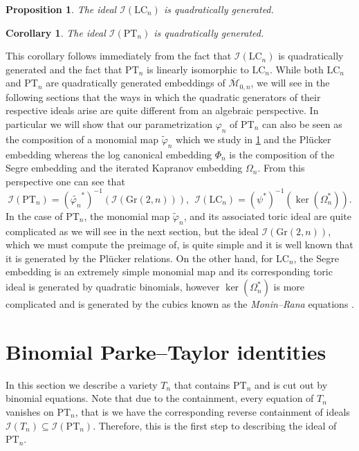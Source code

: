 \documentclass[12pt, reqno]{amsart}
\numberwithin{equation}{section}
\theoremstyle{plain}
\newtheorem{corollary}[theorem]{Corollary}
\newtheorem{proposition}[theorem]{Proposition}
\theoremstyle{definition}
\newcommand{\ci}{\mathcal{I}}
\newcommand{\monbar}{\overline{\mathcal{M}}_{0, n}}
\newcommand{\pt}{\mathrm{PT}}
\newcommand{\lc}{\mathrm{LC}}
\newcommand{\gr}{\mathrm{Gr}}
\begin{document}
\begin{proposition}\cite[Theorem 8.6]{keel2009equations}
The ideal $\ci(\lc_n)$ is quadratically generated. 
\end{proposition}


\begin{corollary}
The ideal $\ci(\pt_n)$ is quadratically generated. 
\end{corollary}



This corollary follows immediately from the fact that $\ci(\lc_n)$ is quadratically generated and the fact that $\pt_n$ is linearly isomorphic to $\lc_n$. 
While both $\lc_n$ and $\pt_n$ are quadratically generated embeddings of $\monbar$, we will see in the following sections that the ways in which the quadratic generators of their respective ideals arise are quite different from an algebraic perspective. In particular we will show that our parametrization $\varphi_n$ of $\pt_n$ can also be seen as the composition of a monomial map $\tilde{\varphi}_n$ which we study in \cref{sec:toric} and the Pl\"ucker embedding whereas the log canonical embedding $\Phi_n$ is the composition of the Segre embedding and the iterated Kapranov embedding $\Omega_n$. From this perspective one can see that
\[
\ci(\pt_n) = (\tilde{\varphi_n}^\ast)^{-1}(\ci(\gr(2,n))), ~~ \ci(\lc_n) = (\psi^\ast)^{-1}(\ker(\Omega_n^\ast)).
\]
In the case of $\pt_n$, the monomial map $\tilde{\varphi}_n$, and its associated toric ideal are quite complicated as we will see in the next section, but the ideal $\ci(\gr(2,n))$, which we must compute the preimage of, is quite simple and it is well known that it is generated by the Pl\"ucker relations. On the other hand, for $\lc_n$, the Segre embedding is an extremely simple monomial map and its corresponding toric ideal is generated by quadratic binomials, however $\ker(\Omega_n^\ast)$ is more complicated and is generated by the cubics known as the \emph{Monin--Rana} equations \cite{gillespie2022proof, monin2017equations}. 


\section{Binomial Parke--Taylor identities} \label{sec:toric}
In this section we describe a variety $T_n$ that contains $\mathrm{PT}_n$ and is cut out by binomial equations. Note that due to the containment, every equation of $T_n$ vanishes on $\mathrm{PT}_n$, that is we have the corresponding reverse containment of ideals $\ci(T_n) \subseteq \ci(\pt_n)$. Therefore, this is the first step to describing the ideal of $\mathrm{PT}_n$.
\end{document}
